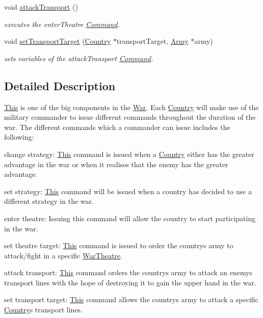 \begin{DoxyCompactItemize}
void \mbox{\hyperlink{class_military_commander_a7f2df2a43dc6fe5bfdd03c6471278fc3}{attack\+Transport}} ()
\begin{DoxyCompactList}\small\item\em executes the enter\+Theatre \mbox{\hyperlink{class_command}{Command}}. \end{DoxyCompactList}\item 
void \mbox{\hyperlink{class_military_commander_a3482b017f78a33581ee32fb3cad7e3e0}{set\+Transport\+Target}} (\mbox{\hyperlink{class_country}{Country}} $\ast$transport\+Target, \mbox{\hyperlink{class_army}{Army}} $\ast$army)
\begin{DoxyCompactList}\small\item\em sets variables of the attack\+Transport \mbox{\hyperlink{class_command}{Command}}. \end{DoxyCompactList}\end{DoxyCompactItemize}


\subsection{Detailed Description}
\mbox{\hyperlink{class_this}{This}} is one of the big components in the \mbox{\hyperlink{class_war}{War}}. Each \mbox{\hyperlink{class_country}{Country}} will make use of the military commander to issue different commands throughout the duration of the war. The different commands which a commander can issue includes the following\+:
\begin{DoxyItemize}
\item change strategy\+: \mbox{\hyperlink{class_this}{This}} command is issued when a \mbox{\hyperlink{class_country}{Country}} either has the greater advantage in the war or when it realises that the enemy has the greater advantage.
\item set strategy\+: \mbox{\hyperlink{class_this}{This}} command will be issued when a country has decided to use a different strategy in the war.
\item enter theatre\+: Issuing this command will allow the country to start participating in the war.
\item set theatre target\+: \mbox{\hyperlink{class_this}{This}} command is issued to order the country\textquotesingle{}s army to attack/fight in a specific \mbox{\hyperlink{class_war_theatre}{War\+Theatre}}.
\item attack transport\+: \mbox{\hyperlink{class_this}{This}} command orders the country\textquotesingle{}s army to attack an enemy\textquotesingle{}s transport lines with the hope of destroying it to gain the upper hand in the war.
\item set transport target\+: \mbox{\hyperlink{class_this}{This}} command allows the country\textquotesingle{}s army to attack a specific \mbox{\hyperlink{class_country}{Country}}\textquotesingle{}s transport lines.
\end{DoxyItemize}

